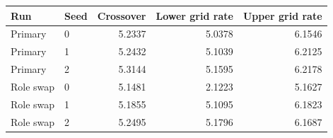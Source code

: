 \begin{tabular}{llrrr}
\toprule
Run & Seed & Crossover & Lower grid rate & Upper grid rate \\
\midrule
Primary & 0 & 5.2337 & 5.0378 & 6.1546 \\
Primary & 1 & 5.2432 & 5.1039 & 6.2125 \\
Primary & 2 & 5.3144 & 5.1595 & 6.2178 \\
Role swap & 0 & 5.1481 & 2.1223 & 5.1627 \\
Role swap & 1 & 5.1855 & 5.1095 & 6.1823 \\
Role swap & 2 & 5.2495 & 5.1796 & 6.1687 \\
\bottomrule
\end{tabular}
